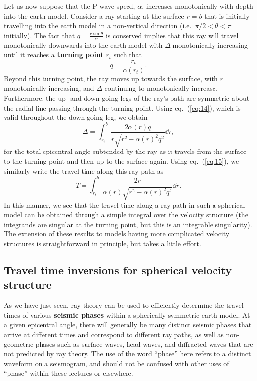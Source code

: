 Let us now suppose that the P-wave speed, $\alpha$, increases monotonically with depth into the earth model. Consider a ray starting at the surface $r=b$ that is initially 
travelling into the earth model in a non-vertical direction (i.e.\ $\pi/2<\theta<\pi$ initially). The fact that $q=\frac{r \sin \theta}{\alpha}$ is conserved implies that this 
ray will travel monotonically downwards into the earth model with $\Delta$ monotonically increasing until it reaches a \textbf{turning point} $r_{t}$ such that
\begin{equation}
q=\frac{r_{t}}{\alpha(r_{t})}.
\label{eq:16}
\end{equation}
Beyond this turning point, the ray moves up towards the surface, with $r$ monotonically increasing, and $\Delta$ continuing to monotonically increase. Furthermore, the up- and down-going 
legs of the ray's path are symmetric about the radial line passing through the turning point. Using eq.~(\ref{eq:14}), which is valid throughout the down-going leg, we obtain
\begin{equation}
\Delta=\int_{r_{t}}^{b}\frac{2\alpha(r)q}{r\sqrt{r^{2}-\alpha(r)^{2}q^{2}}}\dd r,
\label{eq:17}
\end{equation}
for the total epicentral angle subtended by the ray as it travels from the surface to the turning point and then up to the surface again. Using eq.~(\ref{eq:15}), we similarly write the travel time along this ray path as
\begin{equation}
T=\int_{r_{t}}^{b}\frac{2r}{\alpha(r)\sqrt{r^{2}-\alpha(r)^{2}q^{2}}}\dd r.
\label{eq:18}
\end{equation}
In this manner, we see that the travel time along a ray path in such a spherical model can be obtained through a simple integral over the velocity structure (the integrands are 
singular at the turning point, but this is an integrable singularity). The extension of these results to models having more complicated velocity structures is 
straightforward in principle, but takes a little effort.

\subsection*{Travel time inversions for spherical velocity structure}
As we have just seen, ray theory can be used to efficiently determine the travel times of various \textbf{seismic phases} 
within a spherically symmetric earth model. At a given epicentral 
angle, there will generally be many distinct seismic phases that arrive at different times and correspond to different ray 
paths, as well as non-geometric phases such as surface 
waves, head waves, and diffracted waves that are not predicted by ray theory. The use of the word ``phase'' here refers to a distinct 
waveform on a seismogram, and should not 
be confused with other uses of ``phase'' within these lectures or elsewhere.


